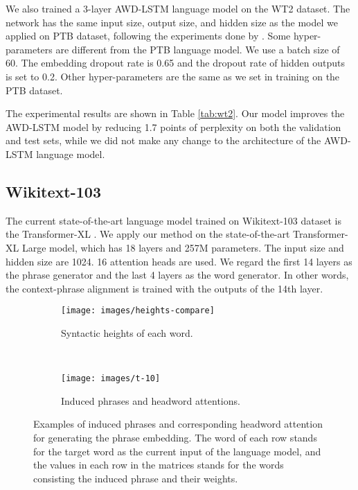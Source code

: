 \documentclass[11pt,a4paper]{article}
\begin{document}
We also trained a 3-layer AWD-LSTM language model on the WT2 dataset. The network has the same input size, output size, and hidden size as the model we applied on PTB dataset, following the experiments done by \citet{merity2017regularizing}. Some hyper-parameters are different from the PTB language model. We use a batch size of 60. The embedding dropout rate is 0.65 and the dropout rate of hidden outputs is set to 0.2. Other hyper-parameters are the same as we set in training on the PTB dataset.

The experimental results are shown in Table \ref{tab:wt2}. Our model improves the AWD-LSTM model by reducing 1.7 points of perplexity on both the validation and test sets, while we did not make any change to the architecture of the AWD-LSTM language model.

\subsection{Wikitext-103}

The current state-of-the-art language model trained on Wikitext-103 dataset is the Transformer-XL \cite{dai2018transformer}. We apply our method on the state-of-the-art Transformer-XL Large model, which has 18 layers and 257M parameters. The input size and hidden size are 1024. 16 attention heads are used. We regard the first 14 layers as the phrase generator and the last 4 layers as the word generator. In other words, the context-phrase alignment is trained with the outputs of the 14th layer.



\begin{figure*}[t!]
    \centering
    \begin{subfigure}[t]{0.5\textwidth}
        \centering
        \texttt{[image: images/heights-compare]}
        \caption{Syntactic heights of each word.}
        \label{fig:e1:a}
    \end{subfigure}~ 
    \begin{subfigure}[t]{0.5\textwidth}
        \centering
        \texttt{[image: images/t-10]}
        \caption{Induced phrases and headword attentions.}
        \label{fig:e1:b}
    \end{subfigure}
    \caption{Examples of induced phrases and corresponding headword attention for generating the phrase embedding. The word of each row stands for the target word as the current input of the language model, and the values in each row in the matrices stands for the words consisting the induced phrase and their weights.}
    \label{fig:e1}
\end{figure*}
\end{document}
